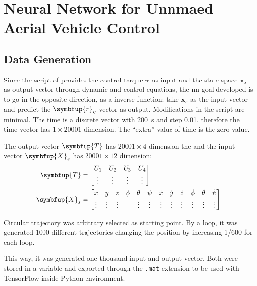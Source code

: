 \section{Neural Network for Unnmaed Aerial Vehicle Control}

\subsection{Data Generation}

Since the script of \citet{geronel2023} provides the control torque \(\symbf{\tau}\) as input and the state-space \(\symbf{x}_s\) as output vector through dynamic and control equations, the \gls*{nn} goal developed is to go in the opposite direction, as a inverse function: take \(\symbf{x}_s\) as the input vector and predict the \(\symbfup{\tau}_{\eta}\) vector as output.
Modifications in the script are minimal.
The time is a discrete vector with \SI{200}{s} and step 0.01, therefore the time vector has \(1\times 20001\) dimension.
The ``extra'' value of time is the zero value.

The output vector \(\symbfup{T}\) has \(20001\times 4\) dimension the and the input vector \(\symbfup{X}_s\) has  \(20001\times 12\) dimension:
%
\begin{align}
    \symbfup{T} &= \begin{bmatrix}
        U_1 & U_2 & U_3 & U_4 \\
        \vdots       & \vdots       & \vdots       & \vdots  \\
    \end{bmatrix} 
    \label{eq:tau_input} \\
    \setcounter{MaxMatrixCols}{13}
    \symbfup{X}_s &=
    \begin{bmatrix}
        x&y&z&\phi&\theta&\psi&\dot{x}&\dot{y}&\dot{z}&\dot{\phi}&\dot{\theta}&\dot{\psi} \\
        \vdots & \vdots & \vdots & \vdots & \vdots & \vdots & \vdots & \vdots & \vdots & \vdots & \vdots & \vdots 
    \end{bmatrix}
    \label{eq:xs_output}
\end{align}

Circular trajectory was arbitrary selected as starting point.
By a loop, it was generated 1000 different trajectories changing the position  by increasing 1/600  for each loop.

This way, it was generated one thousand input and output vector.
Both were stored in a \matlab variable and exported through the \texttt{.mat} extension to be used with TensorFlow inside Python environment.

